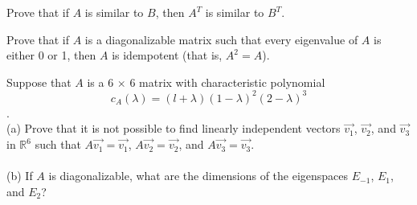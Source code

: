 \documentclass[12pt,letterpaper]{hmcpset}
\begin{document}
\begin{solution}
    \vfill
\end{solution}

\newpage

\begin{problem}[4.4.42]
    Prove that if $A$ is similar to $B$, then $A^T$ is similar to $B^T$.
\end{problem}

\begin{solution}
    \vfill
\end{solution}

\newpage

\begin{problem}[4.4.49]
    Prove that if $A$ is a diagonalizable matrix such that every eigenvalue of $A$ is either 0 or 1, then $A$ is idempotent (that is, $A^2=A$).
\end{problem}

\begin{solution}
    \vfill
\end{solution}

\newpage

\begin{problem}[4.4.51]
    Suppose that $A$ is a 6 $\times$ 6 matrix with characteristic polynomial
    \[c_A(\lambda)=(l+\lambda)(1-\lambda)^2(2-\lambda)^3\].
    \\
    (a) Prove that it is not possible to find linearly independent vectors $\vec{v_1}$, $\vec{v_2}$, and $\vec{v_3}$ in $\mathbb{R}^6$ such that $A\vec{v_1}=\vec{v_1}$, $A\vec{v_2}=\vec{v_2}$, and $A\vec{v_3}=\vec{v_3}$.
    \\\\
    (b) If $A$ is diagonalizable, what are the dimensions of the eigenspaces $E_{-1}$, $E_1$, and $E_2$?
\end{problem}

\begin{solution}
    \vfill
\end{solution}

\newpage
\end{document}
